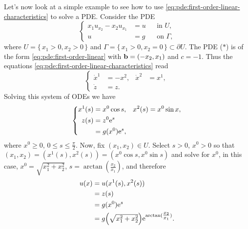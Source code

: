 \begin{example}
  Let's now look at a simple example to see how to use
  \eqref{eq:pde:first-order-linear-characteristics} to solve a PDE.
  Consider the PDE
  \[
    \tag{\(*\)}
    \left\{
      \begin{aligned}
        x_1u_{x_2}-x_2u_{x_1}&=u&&\text{in \(U\),}\\
        u&=g&&\text{on \(\Gamma\),}
      \end{aligned}
    \right.
  \]
  where \(U=\{\,x_1>0,x_2>0\,\}\) and
  \(\Gamma=\{\,x_1>0,x_2=0\,\}\subset\partial U\).  The PDE (\(*\)) is of
  the form \eqref{eq:pde:first-order-linear} with \(\mathbf{b}=(-x_2,x_1)\) and
  \(c=-1\). Thus the equations
  \eqref{eq:pde:first-order-linear-characteristics} read
  \[
    \left\{ \tag{\(**\)}
      \begin{aligned}
        \dot x^1&=-x^2,&\dot x^2&=x^1,\\
        \dot z&=z.
      \end{aligned}
    \right.
  \]
  Solving this system of ODEs we have
  \[
    \left\{
      \begin{aligned}
        x^1(s)&=x^0\cos s,&x^2(s)&=x^0\sin x,\\
        z(s)&=z^0\mathrm{e}^s\\
        &=g(x^0)\mathrm{e}^s,
      \end{aligned}
    \right.
  \]
  where \(x^0\geq 0\), \(0\leq s\leq \tfrac{\pi}{2}\). Now, fix \((x_1,x_2)\in
  U\). Select \(s>0\), \(x^0>0\) so that
  \((x_1,x_2)=(x^1(s),x^2(s))=(x^0\cos s,x^0\sin s)\) and solve for
  \(x^0\), in this case, \(x^0=\sqrt{x_1^2+x_2^2}\),
  \(s=\arctan(\tfrac{x_2}{x_1})\), and therefore
  \begin{align*}
    u(x)&=u(x^1(s),x^2(s))\\
        &=z(s)\\
        &=g(x^0)\mathrm{e}^s\\
        &=g\Bigl({\textstyle\sqrt{x_1^2+x_2^2}}\Bigr)\mathrm{e}^{\arctan(\tfrac{x_2}{x_1})}.
  \end{align*}
\end{example}

